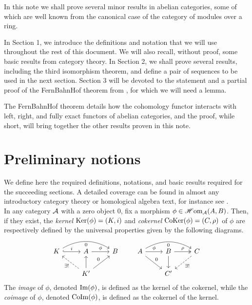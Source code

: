 \documentclass[a4paper]{article}
\begin{document}
\maketitle
In this note we shall prove several minor results in abelian categories, some of which are well known from the canonical case of the category of modules over a ring.

In Section 1, we introduce the definitions and notation that we will use throughout the rest of this document. We will also recall, without proof, some basic results from category theory. In Section 2, we shall prove several results, including the third isomorphism theorem, and define a pair of sequences to be used in the next section. Section 3 will be devoted to the statement and a partial proof of the FernBahnHof theorem from \cite{VakilAG}, for which we will need a lemma.

The FernBahnHof theorem details how the cohomology functor interacts with left, right, and fully exact functors of abelian categories, and the proof, while short, will bring together the other results proven in this note.
\section{Preliminary notions}
We define here the required definitions, notations, and basic results required for the succeeding sections. A detailed coverage can be found in almost any introductory category theory or homological algebra text, for instance see \cite{VakilAG,HS}.\\
In any category $\mathcal{A}$ with a zero object $0$, fix a morphism $\phi \in \operatorname{\mathscr{H}om}_{\mathcal{A}}(A,B)$. Then, if they exist, the \emph{kernel} $\operatorname{Ker}(\phi)=(K,i)$ and \emph{cokernel} $\operatorname{CoKer}(\phi)=(C,\rho)$ of $\phi$ are respectively defined by the universal properties given by the following diagrams.
\[
    \begin{tikzcd}
        K \arrow[r, "i", hook] \arrow[rr, "0"', bend left]& A \arrow[r, "\phi"] & B \\
        & K' \arrow[lu, "\exists!", dashed] \arrow[u] \arrow[ur, "0"] &
    \end{tikzcd}
    \qquad
    \begin{tikzcd}
        A \arrow[r, "\phi"] \arrow[rr, "0"', bend left] \arrow[rd, "0"]& B \arrow[d] \arrow[r, "\rho", two heads] & C \arrow[ld, "\exists!", dashed]\\
        & C' &
    \end{tikzcd}
\]
The \emph{image} of $\phi$, denoted $\operatorname{Im}(\phi)$, is defined as the kernel of the cokernel, while the \emph{coimage} of $\phi$, denoted $\operatorname{CoIm}(\phi)$, is defined as the cokernel of the kernel.\\
\end{document}
